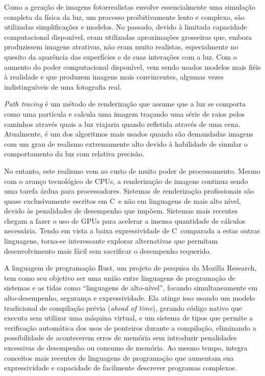 \documentclass[tg]{mdtufsm}
\def\Cpp{{C\nolinebreak[4]\raisebox{.20ex}{\small\bf++}}}
\begin{document}
Como a geração de imagens fotorrealistas envolve essencialmente uma simulação completa da física da
luz, um processo proibitivamente lento e complexo, são utilizadas simplificações e modelos. No
passado, devido à limitada capacidade computacional disponível, eram utilizadas aproximações
grosseiras que, embora produzissem imagens atrativas, não eram muito realistas, especialmente no
quesito da aparência das superfícies e de suas interações com a luz. Com o aumento do poder
computacional disponível, vem sendo usados modelos mais fiéis à realidade e que produzem imagens
mais convincentes, algumas vezes indistinguíveis de uma fotografia real.

\emph{Path tracing} é um método de renderização que assume que a luz se comporta como uma partícula
e calcula uma imagem traçando uma série de raios pelos caminhos através quais a luz viajaria quando
refletida através de uma cena. Atualmente, é um dos algoritmos mais usados quando são demandadas
imagens com um grau de realismo extremamente alto devido à habilidade de simular o
comportamento da luz com relativa precisão. \citep{pharr2010}

No entanto, este realismo vem ao custo de muito poder de processamento. Mesmo com o avanço
tecnológico de CPUs, a renderização de imagens continua sendo uma tarefa árdua para processadores.
Sistemas de renderização profissionais são quase exclusivamente escritos em \Cpp\ e não em
linguagens de mais alto nível, devido às penalidades de desempenho que impõem. Sistemas mais
recentes chegam a fazer o uso de GPUs para acelerar a imensa quantidade de cálculos necessária.
Tendo em vista a baixa expressividade de \Cpp\ comparada a estas outras linguagens, torna-se
interessante explorar alternativas que permitam desenvolvimento mais fácil sem sacrificar o
desempenho requerido.

A linguagem de programação Rust, \citep{rust} um projeto de pesquisa da Mozilla Research, tem como
seu objetivo ser uma união entre linguagens de programação de sistemas e as tidas como ``linguagens
de alto-nível'', focando simultaneamente em alto-desempenho, segurança e expressividade. Ela atinge
isso usando um modelo tradicional de compilação prévia (\emph{ahead of time}), gerando código nativo que executa
sem utilizar uma máquina virtual, e um sistema de tipos
que permite a verificação automática dos usos de ponteiros durante a compilação, eliminando a
possibilidade de acontecerem erros de memória sem introduzir penalidades excessivas de desempenho
ou consumo de memória. Ao mesmo tempo, integra conceitos mais recentes de linguagens de programação
que aumentam sua expressividade e capacidade de facilmente descrever programas complexos.
\end{document}
